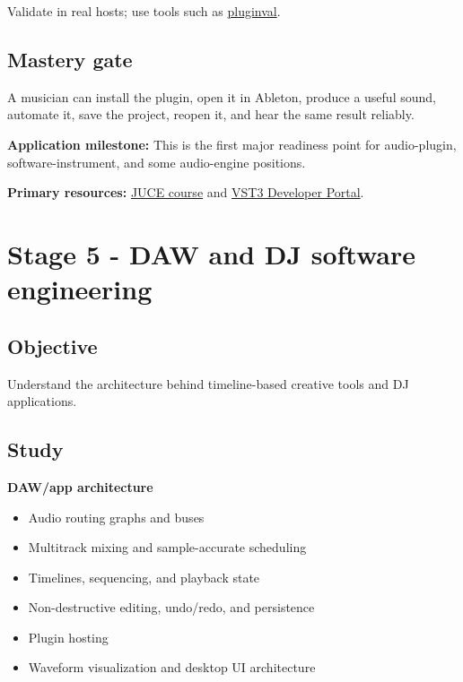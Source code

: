 \documentclass[11pt,letterpaper]{article}
\begin{document}
Validate in real hosts; use tools such as \href{https://github.com/Tracktion/pluginval}{pluginval}.

\subsection*{Mastery gate}\label{mastery-gate-4}

A musician can install the plugin, open it in Ableton, produce a useful sound, automate it, save the project, reopen it, and hear the same result reliably.

\textbf{Application milestone:} This is the first major readiness point for audio-plugin, software-instrument, and some audio-engine positions.

\textbf{Primary resources:} \href{https://juce.com/learn/course/}{JUCE course} and \href{https://steinbergmedia.github.io/vst3_dev_portal/}{VST3 Developer Portal}.

\clearpage

\section{Stage 5 - DAW and DJ software engineering}\label{stage-5-daw-and-dj-software-engineering}

\subsection*{Objective}\label{objective-5}

Understand the architecture behind timeline-based creative tools and DJ applications.

\subsection*{Study}\label{study-2}

\textbf{DAW/app architecture}

\begin{itemize}
\item Audio routing graphs and buses
\item Multitrack mixing and sample-accurate scheduling
\item Timelines, sequencing, and playback state
\item Non-destructive editing, undo/redo, and persistence
\item Plugin hosting
\item Waveform visualization and desktop UI architecture
\end{itemize}
\end{document}
